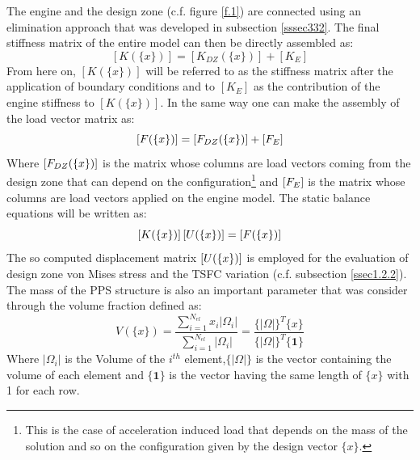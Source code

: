  The engine and the design zone (c.f. figure \ref{f.1}) are connected using an elimination approach that was developed in subsection \ref{sssec332}. The final stiffness matrix of the entire model can then be directly assembled as:
 \begin{equation}
 \label{eq.9}
 \left[K(\lbrace x\rbrace)\right]=\left[K_{DZ}(\lbrace x\rbrace)\right] + \left[K_{E}\right]
 \end{equation}
 From here on,  $\left[K(\lbrace x\rbrace)\right]$ will be referred to as the stiffness matrix after the application of boundary conditions and to $\left[K_{E}\right]$ as the contribution of the engine stiffness to  $\left[K(\lbrace x\rbrace)\right]$.
 In the same way one can make the assembly of the load vector matrix as:
 \begin{equation}
 \label{eq.10}
  \left[{F(\lbrace x\rbrace)}\right] = \left[{ F_{DZ}(\lbrace x\rbrace)}\right]+ \left[{ F_{E} }\right]
 \end{equation}
 Where $\left[{ F_{DZ}(\lbrace x\rbrace) }\right] $ is the matrix whose columns are load vectors coming from the design zone that can depend on the configuration\footnote{This is the case of acceleration induced load that depends on the mass of the solution and so on the configuration given by the design vector $\lbrace x\rbrace$.} and $\left[{ F_{E} }\right] $ is the matrix whose columns are load vectors applied on the engine model.
 The static balance equations will be written as:
 \begin{equation}
 \label{sbeq}
 \left[K(\lbrace x\rbrace)\right]\left[{ U (\lbrace x\rbrace) }\right] = \left[{ F(\lbrace x\rbrace)}\right]
 \end{equation}
 The so computed displacement matrix $\left[{ U (\lbrace x\rbrace)}\right]$ is employed for the evaluation of design zone von Mises stress and  the TSFC variation (c.f. subsection \ref{ssec1.2.2}).
 The mass of the PPS structure is also an important parameter that was consider through the volume fraction defined as:
 \begin{equation}
 \label{eq.12}
 V\left(\lbrace x\rbrace\right)=\frac{\sum_{i=1}^{N_{el}}x_i|\Omega_i|}{\sum_{i=1}^{N_{el}}|\Omega_i|}=\frac{\lbrace|\Omega|\rbrace^T\lbrace x\rbrace }{\lbrace|\Omega|\rbrace^T\lbrace \mathbf{1}\rbrace}
 \end{equation}
 Where $|\Omega_i|$ is the Volume of the $i^{th}$ element,$\lbrace|\Omega|\rbrace$ is the vector containing the volume of each element and $\lbrace \mathbf{1}\rbrace$ is the vector having the same length of $\lbrace x\rbrace$ with 1 for each row.
